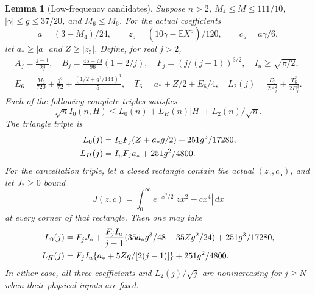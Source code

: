 \documentclass[aop,preprint]{imsart}
\newtheorem{lemma}[theorem]{Lemma}
\theoremstyle{definition}
\newcommand{\E}{\mathbb E}
\numberwithin{equation}{section}
\begin{document}
\begin{lemma}[Low-frequency candidates]\label{ut:low}
Suppose $n>2$, $M_4\le M\le111/10$, $|\gamma|\le g\le37/20$,
and $M_6\le\overline M_6$. For the actual coefficients
\[
 a=(3-M_4)/24,\qquad z_5=(10\gamma-\E X^5)/120,
 \qquad c_5=a\gamma/6,
\]
let $a_*\ge|a|$ and $Z\ge|z_5|$. Define, for real $j>2$,
\begin{gather*}
 A_j=\frac{j-1}{2j},\quad B_j=\frac{45-M}{96}(1-2/j),
 \quad F_j=(j/(j-1))^{3/2},\quad I_u\ge\sqrt{\pi/2},\\
 E_6=\frac{\overline M_6}{720}+\frac{g^2}{72}
                  +\frac{(1/2+g^2/144)^3}{5},\quad
 T_6=a_*+Z/2+E_6/4,\quad
 L_2(j)=\frac{E_6}{2A_j^2}+\frac{T_6^2}{2B_j^3}.
\end{gather*}
Each of the following complete triples satisfies
\begin{equation}\label{ut:low-bound}
 \sqrt n I_0(n,H)\le L_0(n)+L_H(n)|H|+L_2(n)/\sqrt n.
\end{equation}
The triangle triple is
\begin{align}\label{ut:triangle}
 L_0(j)&=I_uF_j(Z+a_*g/2)+251g^3/17280,\notag\\
 L_H(j)&=I_uF_j a_*+251g^2/4800.
\end{align}
For the cancellation triple, let a closed rectangle contain the actual
$(z_5,c_5)$, and let $J_*\ge0$ bound
\[
 J(z,c)=\int_0^\infty e^{-x^2/2}|zx^2-cx^4|\,dx
\]
at every corner of that rectangle. Then one may take
\begin{align}\label{ut:paired}
 L_0(j)&=F_jJ_*+\frac{F_jI_u}{j-1}
       (35a_*g^3/48+35Zg^2/24)+251g^3/17280,\notag\\
 L_H(j)&=F_jI_u\{a_*+5Zg/[2(j-1)]\}+251g^2/4800.
\end{align}
In either case, all three coefficients and $L_2(j)/\sqrt j$ are
nonincreasing for $j\ge N$ when their physical inputs are fixed.
\end{lemma}
\end{document}
